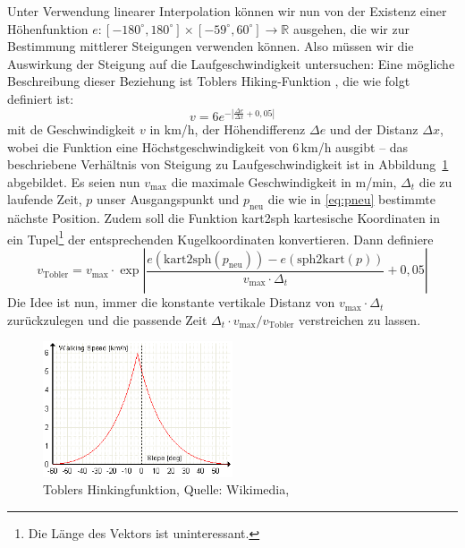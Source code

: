 \documentclass[
    paper=a4,
    DIV14,
    fontsize=12pt,
    pagesize=pdftex,
    toc=bibliographynumbered
]{scrartcl}
\numberwithin{figure}{section}
\numberwithin{equation}{section}
\numberwithin{table}{section}
\newcommand*\setR{\mathds{R}}
\begin{document}
Unter Verwendung linearer Interpolation können wir nun von der Existenz einer
Höhenfunktion $e : [-180^\circ, 180^\circ]\times[-59^\circ, 60^\circ] \to \setR$ ausgehen,
die wir zur Bestimmung mittlerer Steigungen verwenden können. Also müssen wir die
Auswirkung der Steigung auf die Laufgeschwindigkeit untersuchen: Eine mögliche
Beschreibung dieser Beziehung ist Toblers Hiking-Funktion \cite{wp:tobler}, die wie folgt
definiert ist:
\begin{equation*}
    v = 6e^{-\left| \frac{\Delta e}{\Delta x} + 0{,}05 \right|}
\end{equation*}
mit de Geschwindigkeit $v$ in km/h, der Höhendifferenz $\Delta e$ und der Distanz $\Delta
x$, wobei die Funktion eine Höchstgeschwindigkeit von 6\,km/h ausgibt -- das beschriebene
Verhältnis von Steigung zu Laufgeschwindigkeit ist in Abbildung~\ref{fig:tobler}
abgebildet. Es seien nun $v_{\text{max}}$ die maximale Geschwindigkeit in m/min,
$\Delta_t$ die zu laufende Zeit, $p$ unser Ausgangspunkt und $p_{\text{neu}}$ die wie in
\eqref{eq:pneu} bestimmte nächste Position. Zudem soll die Funktion kart2sph kartesische
Koordinaten in ein Tupel\footnote{Die Länge des Vektors ist uninteressant.} der
entsprechenden Kugelkoordinaten konvertieren. Dann definiere
\begin{equation}
    v_{\text{Tobler}} = v_{\text{max}} \cdot \exp\left|
    \frac{e(\mathrm{kart2sph}(p_\text{neu})) - e(\mathrm{sph2kart}(p))}{v_{\text{max}}
    \cdot \Delta_t} + 0{,}05 \right|
    \label{eq:tobler}
\end{equation}
Die Idee ist nun, immer die konstante vertikale Distanz von $v_{\text{max}}\cdot\Delta_t$
zurückzulegen und die passende Zeit $\Delta_t \cdot v_{\text{max}} / v_{\text{Tobler}}$
verstreichen zu lassen.

\begin{figure}[htb]
    \centering
    \includegraphics[width=0.5\textwidth]{images/tobler.png}
    \caption{Toblers Hinkingfunktion, Quelle: Wikimedia, \cite{wp:tobler}}
    \label{fig:tobler}
\end{figure}
\end{document}
